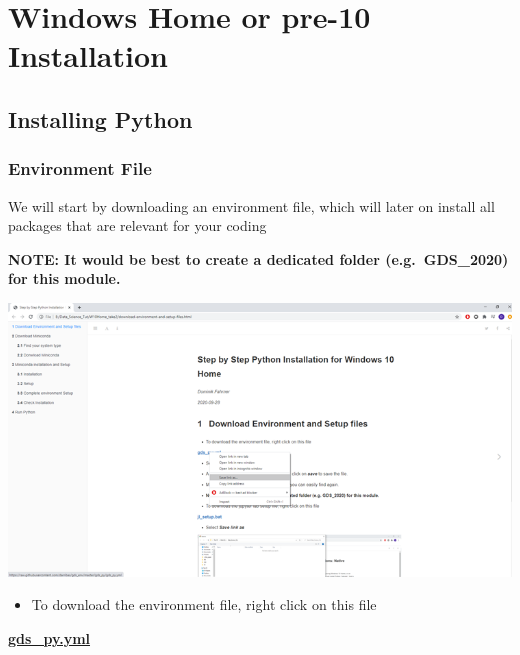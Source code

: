 \documentclass[
]{book}
\providecommand{\tightlist}{%
  \setlength{\itemsep}{0pt}\setlength{\parskip}{0pt}}
\begin{document}
\hypertarget{windows-home-or-pre-10-installation}{%
\chapter*{Windows Home or pre-10 Installation}\label{windows-home-or-pre-10-installation}}

\hypertarget{installing-python}{%
\section*{Installing Python}\label{installing-python}}

\hypertarget{environment-file}{%
\subsection*{Environment File}\label{environment-file}}

We will start by downloading an environment file, which will later on install all packages that are relevant for your coding

\textbf{NOTE: It would be best to create a dedicated folder (e.g.~GDS\_2020) for this module.}

\begin{center}\includegraphics[width=10.22in]{figs/chp4/Picture4} \end{center}

\begin{itemize}
\tightlist
\item
  To download the environment file, right click on this file
\end{itemize}

\href{https://raw.githubusercontent.com/darribas/gds_env/master/gds_py/gds_py.yml}{\textbf{gds\_py.yml}}
\end{document}
